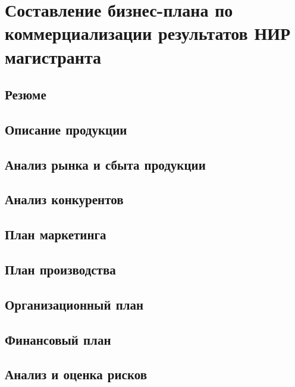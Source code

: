 \chapter{Составление бизнес-плана по коммерциализации результатов НИР магистранта}
\section{Резюме}

\section{Описание продукции}

\section{Анализ рынка и сбыта продукции}

\section{Анализ конкурентов}

\section{План маркетинга}

\section{План производства}

\section{Организационный план}

\section{Финансовый план}

\section{Анализ и оценка рисков}







